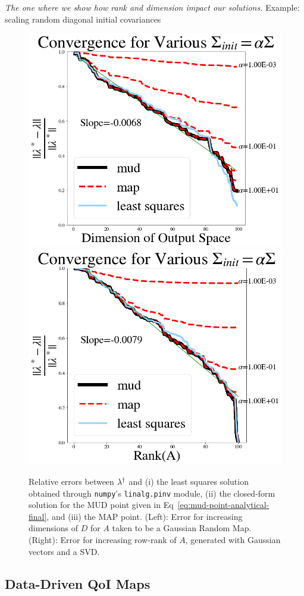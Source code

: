 \begin{frame}[t]{\it The one where we show how rank and dimension impact our solutions.}
\centering
\centering
Example: scaling random diagonal initial covariances

\begin{figure}[htbp]
  \includegraphics[width=0.475\linewidth]{figures/lin/lin-dim-cov-convergence}
  \includegraphics[width=0.475\linewidth]{figures/lin/lin-rank-cov-convergence}
\caption{
	Relative errors between $\lambda^\dagger$ and (i) the least squares solution obtained through {\tt numpy}'s {\tt linalg.pinv} module, (ii) the closed-form solution for the MUD point given in Eq~\eqref{eq:mud-point-analytical-final}, and (iii) the MAP point.
  (Left): Error for increasing dimensions of $D$ for $A$ taken to be a Gaussian Random Map.
  (Right): Error for increasing row-rank of $A$, generated with Gaussian vectors and a SVD.
}
\label{fig:lin-error}
\end{figure}

\end{frame}


\subsection{Data-Driven QoI Maps}

